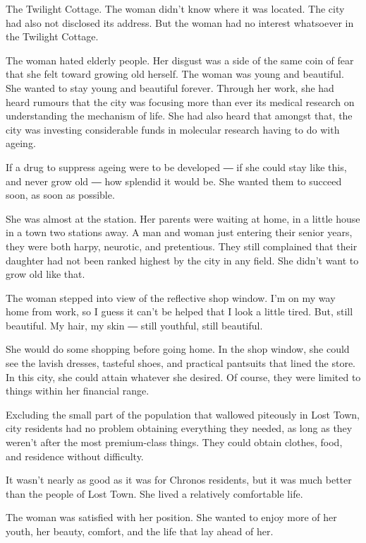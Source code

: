 The Twilight Cottage. The woman didn't know where it was located. The
city had also not disclosed its address. But the woman had no interest
whatsoever in the Twilight Cottage.

The woman hated elderly people. Her disgust was a side of the same coin
of fear that she felt toward growing old herself. The woman was young
and beautiful. She wanted to stay young and beautiful forever. Through
her work, she had heard rumours that the city was focusing more than
ever its medical research on understanding the mechanism of life. She
had also heard that amongst that, the city was investing considerable
funds in molecular research having to do with ageing.

If a drug to suppress ageing were to be developed ― if she could stay
like this, and never grow old ― how splendid it would be. She wanted
them to succeed soon, as soon as possible.

She was almost at the station. Her parents were waiting at home, in a
little house in a town two stations away. A man and woman just entering
their senior years, they were both harpy, neurotic, and pretentious.
They still complained that their daughter had not been ranked highest by
the city in any field. She didn't want to grow old like that.

The woman stepped into view of the reflective shop window. I'm on my way
home from work, so I guess it can't be helped that I look a little
tired. But, still beautiful. My hair, my skin ― still youthful, still
beautiful.

She would do some shopping before going home. In the shop window, she
could see the lavish dresses, tasteful shoes, and practical pantsuits
that lined the store. In this city, she could attain whatever she
desired. Of course, they were limited to things within her financial
range.

Excluding the small part of the population that wallowed piteously in
Lost Town, city residents had no problem obtaining everything they
needed, as long as they weren't after the most premium-class things.
They could obtain clothes, food, and residence without difficulty.

It wasn't nearly as good as it was for Chronos residents, but it was
much better than the people of Lost Town. She lived a relatively
comfortable life.

The woman was satisfied with her position. She wanted to enjoy more of
her youth, her beauty, comfort, and the life that lay ahead of her.

